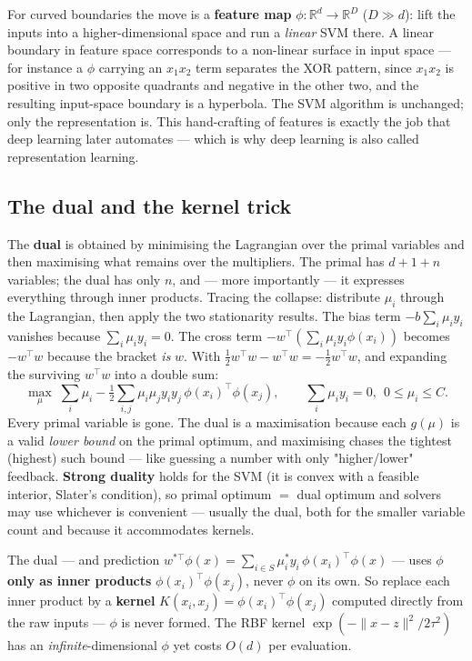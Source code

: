 \documentclass[11pt, a4paper]{article}
\newcommand{\kw}[1]{\textbf{#1}}
\begin{document}
For curved boundaries the move is a \kw{feature map} $\phi:\mathbb R^d\to\mathbb R^D$ ($D\gg d$):
lift the inputs into a higher-dimensional space and run a \emph{linear} SVM there. A linear boundary
in feature space corresponds to a non-linear surface in input space — for instance a $\phi$ carrying
an $x_1x_2$ term separates the XOR pattern, since $x_1x_2$ is positive in two opposite quadrants and
negative in the other two, and the resulting input-space boundary is a hyperbola. The SVM algorithm
is unchanged; only the representation is. This hand-crafting of features is exactly the job that
deep learning later automates — which is why deep learning is also called representation learning.

\subsection{The dual and the kernel trick}

The \kw{dual} is obtained by minimising the Lagrangian over the primal variables and then maximising
what remains over the multipliers. The primal has $d+1+n$ variables; the dual has only $n$, and —
more importantly — it expresses everything through inner products. Tracing the collapse: distribute
$\mu_i$ through the Lagrangian, then apply the two stationarity results. The bias term
$-b\sum_i\mu_i y_i$ vanishes because $\sum_i\mu_i y_i=0$. The cross term
$-w^\top(\sum_i\mu_i y_i\phi(x_i))$ becomes $-w^\top w$ because the bracket \emph{is} $w$. With
$\tfrac12 w^\top w-w^\top w=-\tfrac12 w^\top w$, and expanding the surviving $w^\top w$ into a double
sum:
\[
\max_{\mu}\;\sum_i\mu_i - \tfrac12\sum_{i,j}\mu_i\mu_j y_i y_j\,\phi(x_i)^\top\phi(x_j),
\qquad \sum_i\mu_i y_i=0,\ \ 0\le\mu_i\le C.
\]
Every primal variable is gone. The dual is a maximisation because each $g(\mu)$ is a valid
\emph{lower bound} on the primal optimum, and maximising chases the tightest (highest) such bound —
like guessing a number with only "higher/lower" feedback. \kw{Strong duality} holds for the SVM
(it is convex with a feasible interior, Slater's condition), so primal optimum $=$ dual optimum and
solvers may use whichever is convenient — usually the dual, both for the smaller variable count and
because it accommodates kernels.

\begin{notebox}
The dual — and prediction $w^{\ast\top}\phi(x)=\sum_{i\in S}\mu_i^\ast y_i\,\phi(x_i)^\top\phi(x)$ —
uses $\phi$ \kw{only as inner products} $\phi(x_i)^\top\phi(x_j)$, never $\phi$ on its own. So
replace each inner product by a \kw{kernel} $K(x_i,x_j)=\phi(x_i)^\top\phi(x_j)$ computed directly
from the raw inputs — $\phi$ is never formed. The RBF kernel $\exp(-\|x-z\|^2/2\tau^2)$ has an
\emph{infinite}-dimensional $\phi$ yet costs $O(d)$ per evaluation.
\end{notebox}
\end{document}
